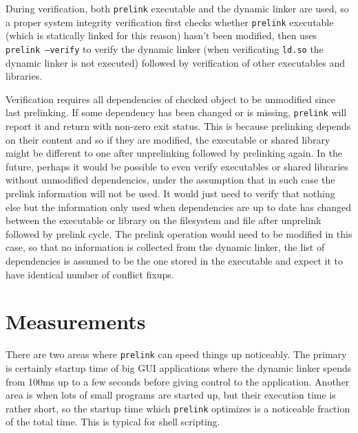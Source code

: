 \documentclass[twoside]{article}
\def\tts#1{\texttt{\small #1}}
\begin{document}
During verification, both \tts{prelink} executable and the dynamic linker
are used, so a proper system integrity verification first checks whether
\tts{prelink} executable (which is statically linked for this reason) hasn't
been modified, then uses \tts{prelink --verify} to verify the dynamic linker
(when verificating \tts{ld.so} the dynamic linker is not executed)
followed by verification of other executables and libraries.

Verification requires all dependencies of checked object to be unmodified
since last prelinking.  If some dependency has been changed or is missing,
\tts{prelink} will report it and return with non-zero exit status.
This is because prelinking depends on their content and so if they are
modified, the executable or shared library might be different to one after
unprelinking followed by prelinking again.  In the future, perhaps it
would be possible to even verify executables or shared libraries without
unmodified dependencies, under the assumption that in such case the prelink
information will not be used.  It would just need to verify that nothing
else but the information only used when dependencies are up to date
has changed between the executable or library on the filesystem and file
after unprelink followed by prelink cycle.  The prelink operation
would need to be modified in this case, so that no information is
collected from the dynamic linker, the list of dependencies is assumed
to be the one stored in the executable and expect it to have identical
number of conflict fixups.

\section{Measurements}

There are two areas where \tts{prelink} can speed things up noticeably.
The primary is certainly startup time of big GUI applications where the
dynamic linker spends from 100ms up to a few seconds before giving control
to the application.  Another area is when lots of small programs are started
up, but their execution time is rather short, so the startup time which
\tts{prelink} optimizes is a noticeable fraction of the total time.
This is typical for shell scripting.
\end{document}
